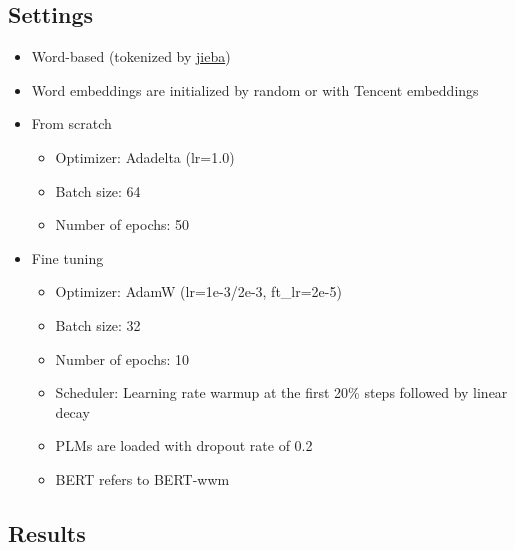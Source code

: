 \documentclass{article}
\begin{document}
\subsection{Settings}
\begin{itemize}
    \item Word-based (tokenized by \href{https://github.com/fxsjy/jieba}{jieba})
    \item Word embeddings are initialized by random or with Tencent embeddings \citep{song2018directional}
    \item From scratch
    \begin{itemize}
        \item Optimizer: Adadelta (lr=1.0)
        \item Batch size: 64
        \item Number of epochs: 50
    \end{itemize}
    \item Fine tuning 
    \begin{itemize}
        \item Optimizer: AdamW (lr=1e-3/2e-3, ft\_lr=2e-5)
        \item Batch size: 32
        \item Number of epochs: 10
        \item Scheduler: Learning rate warmup at the first 20\% steps followed by linear decay
        \item PLMs are loaded with dropout rate of 0.2
        \item BERT refers to BERT-wwm \citep{cui2019pretraining}
    \end{itemize}
\end{itemize}


\subsection{Results}
\end{document}
